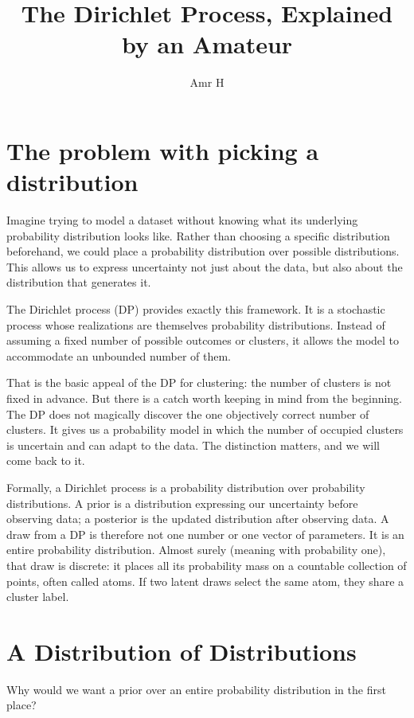 \documentclass[11pt]{article}
\title{The Dirichlet Process, Explained by an Amateur}
\author{Amr H}
\date{}
\begin{document}
\maketitle

\section*{The problem with picking a distribution}

Imagine trying to model a dataset without knowing what its underlying probability distribution looks like. Rather than choosing a specific distribution beforehand, we could place a probability distribution over possible distributions. This allows us to express uncertainty not just about the data, but also about the distribution that generates it.

The Dirichlet process (DP) provides exactly this framework. It is a stochastic process whose realizations are themselves probability distributions. Instead of assuming a fixed number of possible outcomes or clusters, it allows the model to accommodate an unbounded number of them.

That is the basic appeal of the DP for clustering: the number of clusters is not fixed in advance. But there is a catch worth keeping in mind from the beginning. The DP does not magically discover the one objectively correct number of clusters. It gives us a probability model in which the number of occupied clusters is uncertain and can adapt to the data. The distinction matters, and we will come back to it.

Formally, a Dirichlet process is a probability distribution over probability distributions. A prior is a distribution expressing our uncertainty before observing data; a posterior is the updated distribution after observing data. A draw from a DP is therefore not one number or one vector of parameters. It is an entire probability distribution. Almost surely (meaning with probability one), that draw is discrete: it places all its probability mass on a countable collection of points, often called atoms. If two latent draws select the same atom, they share a cluster label.

\section*{A Distribution of Distributions}

Why would we want a prior over an entire probability distribution in the first place?
\end{document}
